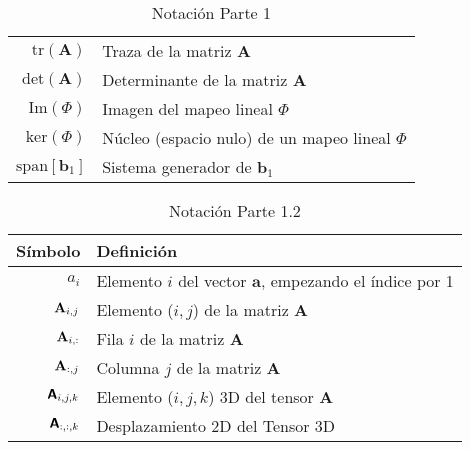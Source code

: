 \begin{table}[ht!]
\begin{center}
\begin{tabularx}{\textwidth}{|r|X|}
            $ \text{tr}\left(\mathbf{A}\right) $                              & Traza de la matriz $\mathbf{A}$                                                                                            \\
            $ \text{det}\left(\mathbf{A}\right) $                             & Determinante de la matriz $\mathbf{A}$                                                                                     \\
            $ \text{Im}\left(\Phi\right) $                                    & Imagen del mapeo lineal $\Phi$                                                                                             \\
            $ \text{ker}\left(\Phi\right) $                                   & Núcleo (espacio nulo) de un mapeo lineal $\Phi$                                                                            \\
            $ \text{span}\left[\mathbf{b}_{1}\right] $                        & Sistema generador de $\mathbf{b}_{1}$                                                                                      \\


            \hline
        \end{tabularx}
        \caption{Notación Parte 1}
        \label{tab:nnotation-part-1}
    \end{center}
\end{table}


\begin{table}[H]
    \begin{center}
        \begin{tabularx}{\textwidth}{|r|X|}
            \hline
            \textbf{Símbolo}             & \textbf{Definición}                                                      \\
            \hline
            ${ a_{i} }$                  & Elemento $i$ del vector $\mathit{\mathbf{a}}$, empezando el índice por 1 \\
            ${ \mathMatrix{A}_{i,j} }$   & Elemento ($i,j$) de la matriz $\mathbf{A}$                               \\
            ${ \mathMatrix{A}_{i,:} }$   & Fila $i$ de la matriz $\mathbf{A}$                                       \\
            ${ \mathMatrix{A}_{:,j} }$   & Columna $j$ de la matriz $\mathbf{A}$                                    \\
            ${ \mathTensor{A}_{i,j,k} }$ & Elemento ($i,j,k$) 3D del tensor $\boldsymbol{\mathbf{A}}$               \\
            ${ \mathTensor{A}_{:,:,k} }$ & Desplazamiento 2D del Tensor 3D                                          \\
            \hline
        \end{tabularx}
        \caption{Notación Parte 1.2}
        \label{tab:nnotation-part-1.2}
    \end{center}
\end{table}



